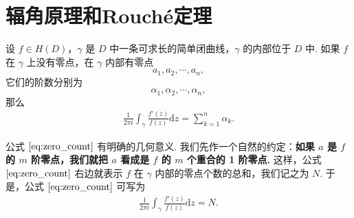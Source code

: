 \documentclass[../../main.tex]{subfiles}
\begin{document}
\section{辐角原理和Rouché定理}

\begin{theorem}\label{theorem:定理4.4.1}
设 \( f \in H(D) \)，\( \gamma \) 是 \( D \) 中一条可求长的简单闭曲线，\( \gamma \) 的内部位于 \( D \) 中. 如果 \( f \) 在 \( \gamma \) 上没有零点，在 \( \gamma \) 内部有零点
\[
a_1, a_2, \cdots, a_n,
\]
它们的阶数分别为
\[
\alpha_1, \alpha_2, \cdots, \alpha_n,
\]
那么
\begin{align}
\frac{1}{2\pi i} \int_{\gamma} \frac{f'(z)}{f(z)} \mathrm{d}z = \sum_{k=1}^{n} \alpha_k. \label{eq:zero_count}
\end{align}
\end{theorem}
\begin{remark}
公式 \(\eqref{eq:zero_count}\) 有明确的几何意义. 我们先作一个自然的约定：\textbf{如果 \( a \) 是 \( f \) 的 \( m \) 阶零点，我们就把 \( a \) 看成是 \( f \) 的 \( m \) 个重合的 1 阶零点.} 这样，公式 \(\eqref{eq:zero_count}\) 右边就表示 \( f \) 在 \( \gamma \) 内部的零点个数的总和，我们记之为 \( N \). 于是，公式 \(\eqref{eq:zero_count}\) 可写为
\begin{align}
\frac{1}{2\pi i} \int_{\gamma} \frac{f'(z)}{f(z)} \mathrm{d}z = N. \label{eq:zero_count_geo}
\end{align}
\end{remark}
\end{document}
